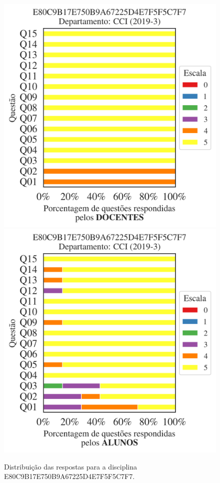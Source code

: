 \documentclass[a4paper,10pt]{article}
\begin{document}
\begin{figure}[h]
\centering
\includegraphics[width=0.485\linewidth]{analise_disciplina_departamento_CCI_E80C9B17E750B9A67225D4E7F5F5C7F7_docentes.png}
\includegraphics[width=0.485\linewidth]{analise_disciplina_departamento_CCI_E80C9B17E750B9A67225D4E7F5F5C7F7_alunos.png}
\caption{\label{fig:analise_geral_departamento}                Distribuição das respostas para a disciplina E80C9B17E750B9A67225D4E7F5F5C7F7. }
\end{figure}
\end{document}

